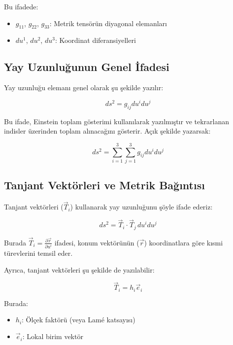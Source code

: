\documentclass[11pt,letterpaper,twocolumn]{fenbil}
\begin{document}
Bu ifadede:
\begin{itemize}
\item $g_{11}$, $g_{22}$, $g_{33}$: Metrik tensörün diyagonal elemanları
\item $du^1$, $du^2$, $du^3$: Koordinat diferansiyelleri
\end{itemize}

\subsection{Yay Uzunluğunun Genel İfadesi}

Yay uzunluğu elemanı genel olarak şu şekilde yazılır:

\begin{equation}
ds^2 = g_{ij}du^i du^j
\end{equation}

Bu ifade, Einstein toplam gösterimi kullanılarak yazılmıştır ve tekrarlanan indisler üzerinden toplam alınacağını gösterir. Açık şekilde yazarsak:

\begin{equation}
ds^2 = \sum_{i=1}^3 \sum_{j=1}^3 g_{ij}du^i du^j
\end{equation}

\subsection{Tanjant Vektörleri ve Metrik Bağıntısı}

Tanjant vektörleri ($\vec{T}_i$) kullanarak yay uzunluğunu şöyle ifade ederiz:

\begin{equation}
ds^2 = \vec{T}_i \cdot \vec{T}_j \, du^i du^j
\end{equation}

Burada $\vec{T}_i = \frac{\partial \vec{r}}{\partial u^i}$ ifadesi, konum vektörünün ($\vec{r}$) koordinatlara göre kısmi türevlerini temsil eder.

Ayrıca, tanjant vektörleri şu şekilde de yazılabilir:

\begin{equation}
\vec{T}_i = h_i \vec{e}_i
\end{equation}

Burada:
\begin{itemize}
\item $h_i$: Ölçek faktörü (veya Lamé katsayısı)
\item $\vec{e}_i$: Lokal birim vektör
\end{itemize}
\end{document}
